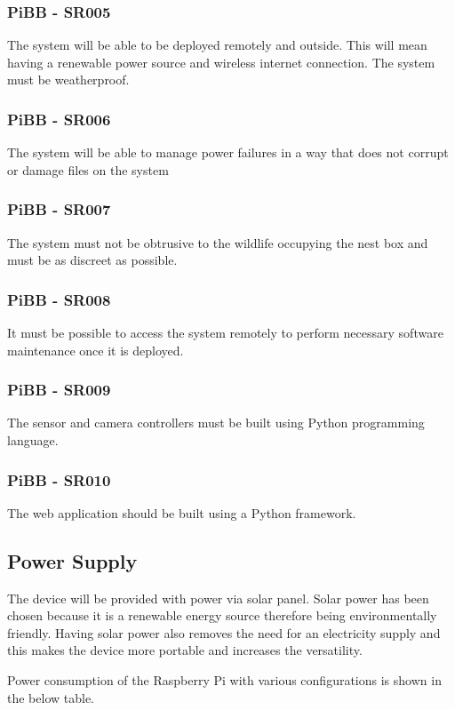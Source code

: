 \documentclass[10pt,a4paper]{article}
\begin{document}
\subsubsection{PiBB - SR005}
The system will be able to be deployed remotely and outside. This will mean having a renewable power source and wireless internet connection. The system must be weatherproof.
\subsubsection{PiBB - SR006}
The system will be able to manage power failures in a way that does not corrupt or damage files on the system
\subsubsection{PiBB - SR007}
The system must not be obtrusive to the wildlife occupying the nest box and must be as discreet as possible. 
\subsubsection{PiBB - SR008}
It must be possible to access the system remotely to perform necessary software maintenance once it is deployed. 
\subsubsection{PiBB - SR009}
The sensor and camera controllers must be built using Python programming language.
\subsubsection{PiBB - SR010}
The web application should be built using a Python framework.
\subsection{Power Supply}
The device will be provided with power via solar panel. Solar power has been chosen because it is a renewable energy source therefore being environmentally friendly. Having solar power also removes the need for an electricity supply and this makes the device more portable and increases the versatility. 

Power consumption of the Raspberry Pi with various configurations is shown in the below table. 
\end{document}
